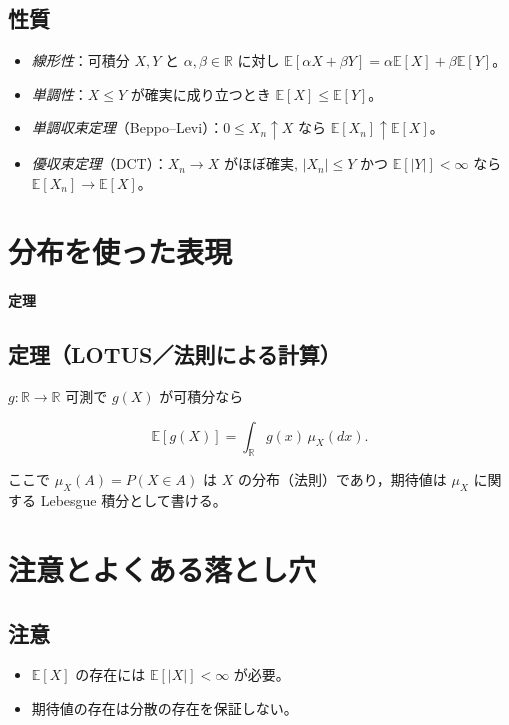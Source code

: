 \documentclass[uplatex,dvipdfmx,11pt,a4paper,openany]{bxjsbook}
\begin{document}
\subsection{性質}
\begin{itemize}
\item \emph{線形性}：可積分 $X, Y$ と $\alpha, \beta \in \mathbb{R}$ に対し $\mathbb{E}[\alpha X + \beta Y] = \alpha \mathbb{E}[X] + \beta \mathbb{E}[Y]$。
\item \emph{単調性}：$X \le Y$ が確実に成り立つとき $\mathbb{E}[X] \le \mathbb{E}[Y]$。
\item \emph{単調収束定理}（Beppo–Levi）：$0 \le X_n \uparrow X$ なら $\mathbb{E}[X_n] \uparrow \mathbb{E}[X]$。
\item \emph{優収束定理}（DCT）：$X_n \to X$ がほぼ確実, $|X_n| \le Y$ かつ $\mathbb{E}[|Y|] < \infty$ なら $\mathbb{E}[X_n] \to \mathbb{E}[X]$。
\end{itemize}

\section{分布を使った表現}
\paragraph{定理}
\subsection{定理（LOTUS／法則による計算）}
$g \colon \mathbb{R} \to \mathbb{R}$ 可測で $g(X)$ が可積分なら

\[\mathbb{E}[g(X)] = \int_{\mathbb{R}} g(x)\,\mu_X(dx).\]

ここで $\mu_X (A)= P (X\in A)$ は $X$ の分布（法則）であり，期待値は $\mu_X$ に関する Lebesgue 積分として書ける。


\section{注意とよくある落とし穴}
\subsection{注意}
\begin{itemize}
\item $\mathbb{E}[X]$ の存在には $\mathbb{E}[|X|] < \infty$ が必要。
\item 期待値の存在は分散の存在を保証しない。
\end{itemize}
\end{document}
